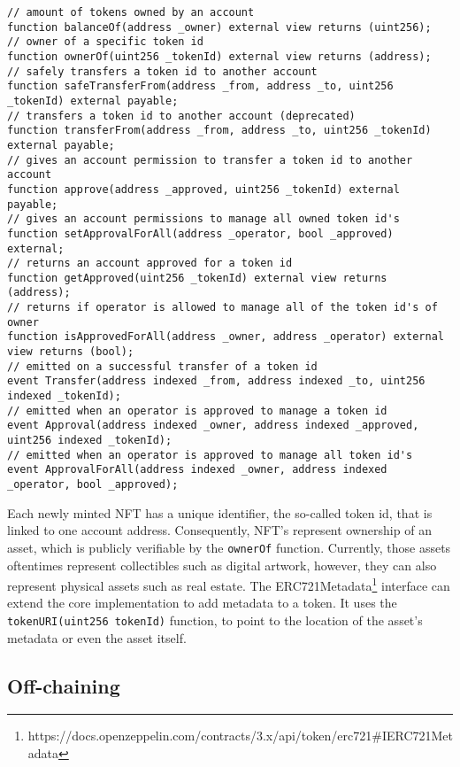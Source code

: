 \begin{lstlisting}[language=Solidity,caption={Core interface of an ERC-721 compliant token},label={lst:erc721-implementation}]
// amount of tokens owned by an account
function balanceOf(address _owner) external view returns (uint256);
// owner of a specific token id
function ownerOf(uint256 _tokenId) external view returns (address);
// safely transfers a token id to another account
function safeTransferFrom(address _from, address _to, uint256 _tokenId) external payable;
// transfers a token id to another account (deprecated)
function transferFrom(address _from, address _to, uint256 _tokenId) external payable;
// gives an account permission to transfer a token id to another account
function approve(address _approved, uint256 _tokenId) external payable;
// gives an account permissions to manage all owned token id's
function setApprovalForAll(address _operator, bool _approved) external;
// returns an account approved for a token id
function getApproved(uint256 _tokenId) external view returns (address);
// returns if operator is allowed to manage all of the token id's of owner 
function isApprovedForAll(address _owner, address _operator) external view returns (bool);
// emitted on a successful transfer of a token id
event Transfer(address indexed _from, address indexed _to, uint256 indexed _tokenId);
// emitted when an operator is approved to manage a token id
event Approval(address indexed _owner, address indexed _approved, uint256 indexed _tokenId);
// emitted when an operator is approved to manage all token id's
event ApprovalForAll(address indexed _owner, address indexed _operator, bool _approved);
\end{lstlisting}

Each newly minted NFT has a unique identifier, the so-called token id, that is linked to one account address. Consequently, NFT's represent ownership of an asset, which is publicly verifiable by the \texttt{ownerOf} function. Currently, those assets oftentimes represent collectibles such as digital artwork, however, they can also represent physical assets such as real estate. The ERC721Metadata\footnote{https://docs.openzeppelin.com/contracts/3.x/api/token/erc721\#IERC721Metadata} interface can extend the core implementation to add metadata to a token. It uses the \texttt{tokenURI(uint256 tokenId)} function, to point to the location of the asset's metadata or even the asset itself.

\subsection{Off-chaining}
\label{subsec:onoff}

